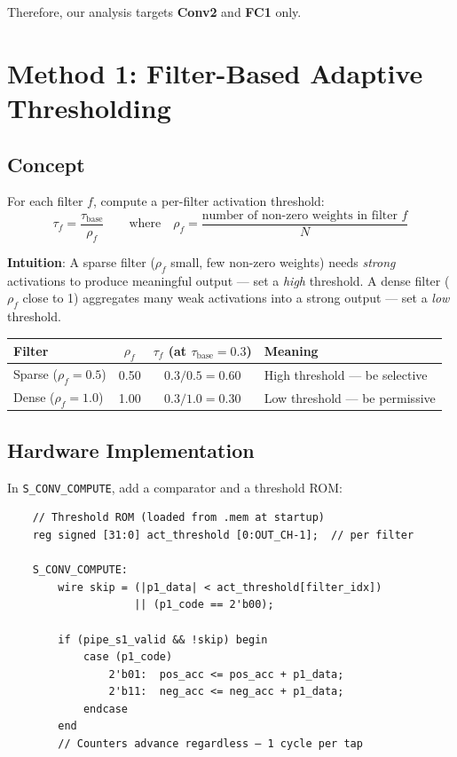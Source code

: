 \documentclass[11pt,a4paper]{article}
\begin{document}
Therefore, our analysis targets \textbf{Conv2} and \textbf{FC1} only.

\section{Method 1: Filter-Based Adaptive Thresholding}
\label{sec:method1}

\subsection{Concept}

For each filter $f$, compute a per-filter activation threshold:
\begin{equation}
\boxed{\tau_f = \frac{\tau_{\text{base}}}{\rho_f}}
\qquad\text{where}\quad
\rho_f = \frac{\text{number of non-zero weights in filter } f}{N}
\end{equation}

\noindent\textbf{Intuition}: A sparse filter ($\rho_f$ small, few non-zero weights)
needs \emph{strong} activations to produce meaningful output — set a \emph{high}
threshold. A dense filter ($\rho_f$ close to 1) aggregates many weak
activations into a strong output — set a \emph{low} threshold.

\begin{center}
\begin{tabular}{lccl}
\toprule
\textbf{Filter} & $\rho_f$ & $\tau_f$ (at $\tau_{\text{base}}=0.3$) & \textbf{Meaning} \\
\midrule
Sparse ($\rho_f = 0.5$) & 0.50 & $0.3 / 0.5 = 0.60$ & High threshold — be selective \\
Dense  ($\rho_f = 1.0$) & 1.00 & $0.3 / 1.0 = 0.30$ & Low threshold — be permissive \\
\bottomrule
\end{tabular}
\end{center}

\subsection{Hardware Implementation}

In \texttt{S\_CONV\_COMPUTE}, add a comparator and a threshold ROM:

\begin{verbatim}
    // Threshold ROM (loaded from .mem at startup)
    reg signed [31:0] act_threshold [0:OUT_CH-1];  // per filter

    S_CONV_COMPUTE:
        wire skip = (|p1_data| < act_threshold[filter_idx])
                    || (p1_code == 2'b00);

        if (pipe_s1_valid && !skip) begin
            case (p1_code)
                2'b01:  pos_acc <= pos_acc + p1_data;
                2'b11:  neg_acc <= neg_acc + p1_data;
            endcase
        end
        // Counters advance regardless — 1 cycle per tap
\end{verbatim}
\end{document}
